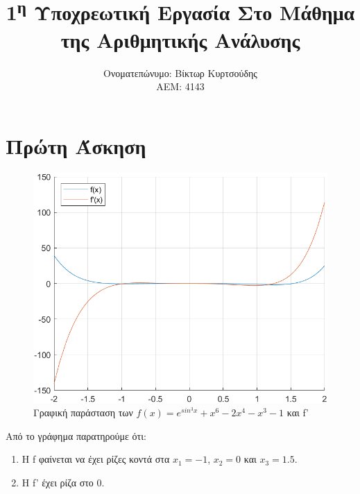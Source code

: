 \documentclass[a4paper,11pt]{article}
\title{1\textsuperscript{η} Υποχρεωτική Εργασία Στο Μάθημα της Αριθμητικής Ανάλυσης}
\author{Ονοματεπώνυμο: Βίκτωρ Κυρτσούδης \\ ΑΕΜ: 4143}
\date{}
\begin{document}
\maketitle

\section{Πρώτη Άσκηση}

\begin{figure}[h]
    \caption{Γραφική παράσταση των $f(x) = e^{sin^3x}+x^6-2x^4-x^3-1$ και f'}
    \includegraphics[width=\textwidth]{exercise1plot.png}
\end{figure}

Από το γράφημα παρατηρούμε ότι:
\begin{enumerate}
    \item Η f φαίνεται να έχει ρίζες κοντά στα $x_1=-1$, $x_2=0$ και $x_3=1.5$.
    \item Η f' έχει ρίζα στο 0.
\end{enumerate}

\end{document}
